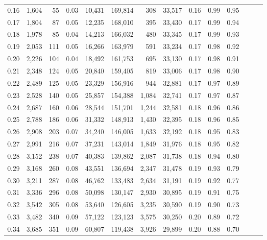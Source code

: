 \begin{tabular}{rrrrrrrrrrrrrr}
0.16 &  1,604 &   55 &  0.03 &   10,431 &  169,814 &     308 &  33,517 &  0.16 &  0.99 &      0.95 \\
0.17 &  1,804 &   87 &  0.05 &   12,235 &  168,010 &     395 &  33,430 &  0.17 &  0.99 &      0.94 \\
0.18 &  1,978 &   85 &  0.04 &   14,213 &  166,032 &     480 &  33,345 &  0.17 &  0.99 &      0.93 \\
0.19 &  2,053 &  111 &  0.05 &   16,266 &  163,979 &     591 &  33,234 &  0.17 &  0.98 &      0.92 \\
0.20 &  2,226 &  104 &  0.04 &   18,492 &  161,753 &     695 &  33,130 &  0.17 &  0.98 &      0.91 \\
0.21 &  2,348 &  124 &  0.05 &   20,840 &  159,405 &     819 &  33,006 &  0.17 &  0.98 &      0.90 \\
0.22 &  2,489 &  125 &  0.05 &   23,329 &  156,916 &     944 &  32,881 &  0.17 &  0.97 &      0.89 \\
0.23 &  2,528 &  140 &  0.05 &   25,857 &  154,388 &   1,084 &  32,741 &  0.17 &  0.97 &      0.87 \\
0.24 &  2,687 &  160 &  0.06 &   28,544 &  151,701 &   1,244 &  32,581 &  0.18 &  0.96 &      0.86 \\
0.25 &  2,788 &  186 &  0.06 &   31,332 &  148,913 &   1,430 &  32,395 &  0.18 &  0.96 &      0.85 \\
0.26 &  2,908 &  203 &  0.07 &   34,240 &  146,005 &   1,633 &  32,192 &  0.18 &  0.95 &      0.83 \\
0.27 &  2,991 &  216 &  0.07 &   37,231 &  143,014 &   1,849 &  31,976 &  0.18 &  0.95 &      0.82 \\
0.28 &  3,152 &  238 &  0.07 &   40,383 &  139,862 &   2,087 &  31,738 &  0.18 &  0.94 &      0.80 \\
0.29 &  3,168 &  260 &  0.08 &   43,551 &  136,694 &   2,347 &  31,478 &  0.19 &  0.93 &      0.79 \\
0.30 &  3,211 &  287 &  0.08 &   46,762 &  133,483 &   2,634 &  31,191 &  0.19 &  0.92 &      0.77 \\
0.31 &  3,336 &  296 &  0.08 &   50,098 &  130,147 &   2,930 &  30,895 &  0.19 &  0.91 &      0.75 \\
0.32 &  3,542 &  305 &  0.08 &   53,640 &  126,605 &   3,235 &  30,590 &  0.19 &  0.90 &      0.73 \\
0.33 &  3,482 &  340 &  0.09 &   57,122 &  123,123 &   3,575 &  30,250 &  0.20 &  0.89 &      0.72 \\
0.34 &  3,685 &  351 &  0.09 &   60,807 &  119,438 &   3,926 &  29,899 &  0.20 &  0.88 &      0.70 \\

\end{tabular}
